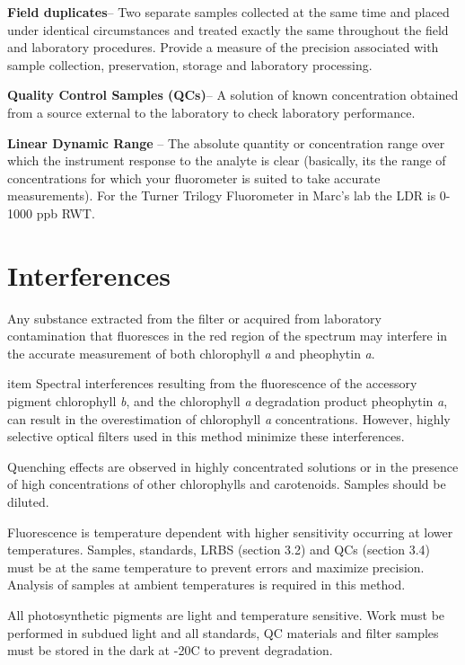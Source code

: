 \documentclass[12pt]{../SOP3_alpha}
\begin{document}
\NP \textbf{Field duplicates}-- Two separate samples collected at the same time and placed under identical circumstances and treated exactly the same throughout the field and laboratory procedures. Provide a measure of the precision associated with sample collection, preservation, storage and laboratory processing. 

\NP \textbf{Quality Control Samples (QCs)}-- A solution of known concentration obtained from a source external to the laboratory to check laboratory performance.

\NP \textbf{Linear Dynamic Range} -- The absolute quantity or concentration range over which the instrument response to the analyte is clear (basically, its the range of concentrations for which your fluorometer is suited to take accurate measurements). For the Turner Trilogy Fluorometer in Marc's lab the LDR is 0-1000 ppb RWT. 


\section{Interferences}
\NP Any substance extracted from the filter or acquired from laboratory contamination that fluoresces in the red region of the spectrum may interfere in the accurate measurement of both chlorophyll \textit{a} and pheophytin \textit{a}.

\NP item Spectral interferences resulting from the fluorescence of the accessory pigment chlorophyll \textit{b}, and the chlorophyll \textit{a} degradation product pheophytin \textit{a}, can result in the overestimation of chlorophyll \textit{a} concentrations. However, highly selective optical filters used in this method minimize these interferences.

\NP Quenching effects are observed in highly concentrated solutions or in the presence of high concentrations of other chlorophylls and carotenoids. Samples should be diluted.

\NP Fluorescence is temperature dependent with higher sensitivity occurring at lower temperatures. Samples, standards, LRBS (section 3.2) and QCs (section 3.4) must be at the same temperature to prevent errors and maximize precision. Analysis of samples at ambient temperatures is required in this method.

\NP All photosynthetic pigments are light and temperature sensitive. Work must be performed in subdued light and all standards, QC materials and filter samples must be stored in the dark at -20\degree C to prevent degradation.
\end{document}
